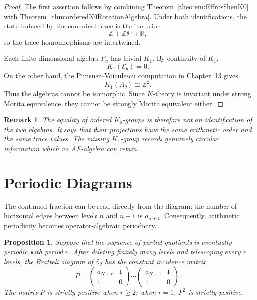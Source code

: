 \documentclass{book}
\newtheorem{proposition}[definition]{Proposition}
\newtheorem{remark}[definition]{Remark}
\begin{document}
\begin{proof}
  The first assertion follows by combining
  Theorem~\ref{theorem:EffrosShenK0} with
  Theorem~\ref{thm:orderedK0RotationAlgebra}.  Under both identifications,
  the state induced by the canonical trace is the inclusion
  \[
    \mathbb Z+\mathbb Z\theta\hookrightarrow\mathbb R,
  \]
  so the trace homomorphisms are intertwined.

  Each finite-dimensional algebra \(F_n\) has trivial \(K_1\).  By
  continuity of \(K_1\),
  \[
    K_1(\mathcal E_\theta)=0.
  \]
  On the other hand, the Pimsner--Voiculescu computation in
  Chapter~13 gives
  \[
    K_1(A_\theta)\cong\mathbb Z^2.
  \]
  Thus the algebras cannot be isomorphic.  Since \(K\)-theory is invariant
  under strong Morita equivalence, they cannot be strongly Morita
  equivalent either.
\end{proof}

\begin{remark}
  The equality of ordered \(K_0\)-groups is therefore not an identification
  of the two algebras.  It says that their projections have the same
  arithmetic order and the same trace values.  The missing \(K_1\)-group
  records genuinely circular information which no AF-algebra can retain.
\end{remark}

\section{Periodic Diagrams}

The continued fraction can be read directly from the diagram: the number
of horizontal edges between levels \(n\) and \(n+1\) is \(a_{n+1}\).
Consequently, arithmetic periodicity becomes operator-algebraic
periodicity.

\begin{proposition}\label{proposition:EffrosShenPeriodic}
  Suppose that the sequence of partial quotients is eventually periodic
  with period \(r\).  After deleting finitely many levels and telescoping
  every \(r\) levels, the Bratteli diagram of \(\mathcal E_\theta\) has the
  constant incidence matrix
  \[
    P=
    \begin{pmatrix}a_{N+r}&1\\1&0\end{pmatrix}
    \cdots
    \begin{pmatrix}a_{N+1}&1\\1&0\end{pmatrix}.
  \]
  The matrix \(P\) is strictly positive when \(r\geq2\); when \(r=1\),
  \(P^2\) is strictly positive.
\end{proposition}
\end{document}
